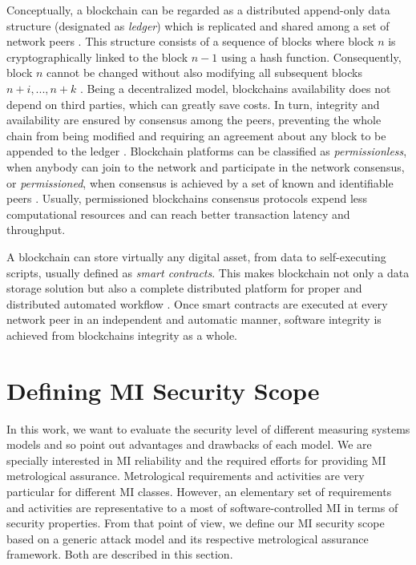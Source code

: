 \documentclass[journal]{IEEEtran}
\begin{document}
Conceptually, a blockchain can be regarded as a distributed append-only data structure (designated as \emph{ledger}) which is replicated and shared among a set of network peers \cite{Christidis2016}. 
This structure consists of a sequence of blocks where block $n$ is cryptographically linked to the block $n-1$ using a hash function.
Consequently, block $n$ cannot be changed without also modifying all subsequent blocks $n + i, ..., n + k$ \cite{Sousa2018}. 
Being a decentralized model, blockchains availability does not depend on third parties, which can greatly save costs.
In turn, integrity and availability are ensured by consensus among the peers, preventing the whole chain from being modified and requiring an agreement about any block to be appended to the ledger \cite{Sousa2018,Vukolic2016}.
Blockchain platforms can be classified as \emph{permissionless}, when anybody can join to the network and participate in the network consensus, or \emph{permissioned}, when consensus is achieved by a set of known and identifiable peers \cite{Vukolic2016}. Usually, permissioned blockchains consensus protocols expend less computational resources and can reach better transaction latency and throughput.

A blockchain can store virtually any digital asset, from data to self-executing scripts, usually defined as \emph{smart contracts}. %
This makes blockchain not only a data storage solution but also a complete distributed platform for proper and distributed automated workflow \cite{Christidis2016}.
Once smart contracts are executed at every network peer in an independent and automatic manner, software integrity is achieved from blockchains integrity as a whole. 

\section{Defining MI Security Scope}
In this work, we want to evaluate the security level of different measuring systems models and so point out advantages and drawbacks of each model. 
We are specially interested in MI reliability and the required efforts for providing MI metrological assurance.
Metrological requirements and activities are very particular for different MI classes. 
However, an elementary set of requirements and activities are representative to a most of software-controlled MI in terms of security properties. 
From that point of view, we define our MI security scope based on a generic attack model and its respective metrological assurance framework. Both are described in this section. %
\end{document}
